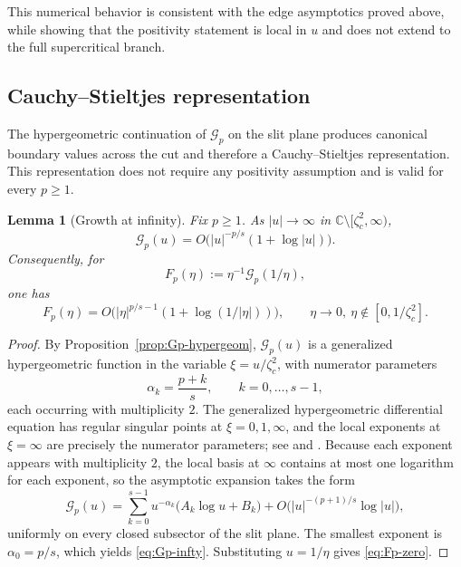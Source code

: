 \documentclass[11pt]{amsart}
\numberwithin{equation}{section}
\theoremstyle{plain}
\newtheorem{lemma}[theorem]{Lemma}
\theoremstyle{definition}
\theoremstyle{remark}
\newcommand{\CC}{\mathbb{C}}
\begin{document}
This numerical behavior is consistent with the edge asymptotics proved above,
while showing that the positivity statement is local in \(u\) and does not
extend to the full supercritical branch.

\subsection{Cauchy--Stieltjes representation}
\label{subsec:stieltjes}

The hypergeometric continuation of \(\mathcal G_p\) on the slit plane
produces canonical boundary values across the cut and therefore a
Cauchy--Stieltjes representation. This representation does not require any
positivity assumption and is valid for every \(p\ge1\).

\begin{lemma}[Growth at infinity]
	\label{lem:Gp-infty}
	Fix \(p\ge1\). As \(|u|\to\infty\) in
	\(\CC\setminus[\zeta_c^2,\infty)\),
	\begin{equation}\label{eq:Gp-infty}
		\mathcal G_p(u)
		=
		O\bigl(|u|^{-p/s}(1+\log|u|)\bigr).
	\end{equation}
	Consequently, for
	\[
		F_p(\eta):=\eta^{-1}\mathcal G_p(1/\eta),
	\]
	one has
	\begin{equation}\label{eq:Fp-zero}
		F_p(\eta)
		=
		O\bigl(|\eta|^{p/s-1}(1+\log(1/|\eta|))\bigr),
		\qquad
		\eta\to0,\ \eta\notin[0,1/\zeta_c^2].
	\end{equation}
\end{lemma}

\begin{proof}
	By Proposition~\ref{prop:Gp-hypergeom},
	\(\mathcal G_p(u)\) is a generalized hypergeometric function in the
	variable \(\xi=u/\zeta_c^2\), with numerator parameters
	\[
		\alpha_k=\frac{p+k}{s},
		\qquad k=0,\dots,s-1,
	\]
	each occurring with multiplicity \(2\). The generalized hypergeometric
	differential equation has regular singular points at \(\xi=0,1,\infty\),
	and the local exponents at \(\xi=\infty\) are precisely the numerator
	parameters; see \cite[\S16.11(i)]{NIST:DLMF} and \cite[Ch.~4]{Slater1966}.
	Because each exponent appears with multiplicity \(2\), the local basis at
	\(\infty\) contains at most one logarithm for each exponent, so the
	asymptotic expansion takes the form
	\[
		\mathcal G_p(u)
		=
		\sum_{k=0}^{s-1}
		u^{-\alpha_k}\bigl(A_k\log u+B_k\bigr)
		+
		O\!\bigl(|u|^{-(p+1)/s}\log|u|\bigr),
	\]
	uniformly on every closed subsector of the slit plane. The smallest
	exponent is \(\alpha_0=p/s\), which yields \eqref{eq:Gp-infty}.
	Substituting \(u=1/\eta\) gives \eqref{eq:Fp-zero}.
\end{proof}
\end{document}
